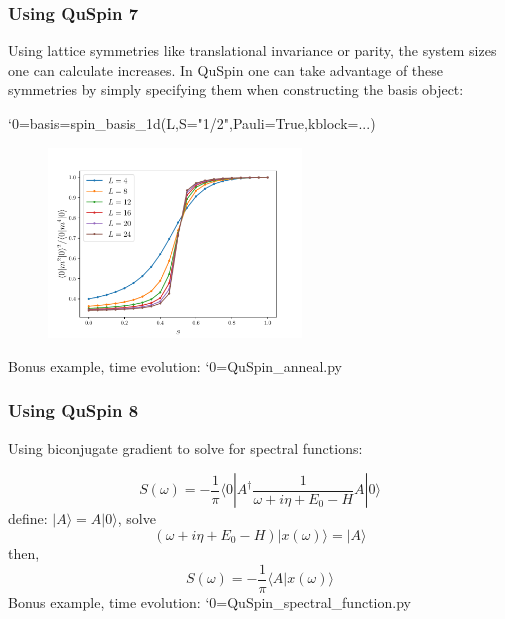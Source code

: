 \documentclass{beamer}
\newcommand\0{\scalebox{-1}[1]{0}}
\let\svttfamily\ttfamily
\renewcommand\ttfamily{\svttfamily\catcode`0=\active }
\renewcommand\texttt{\bgroup\ttfamily\texttthelp}
\def\texttthelp#1{#1\egroup}
\begin{document}
\begin{frame}
\frametitle{Using QuSpin 7}
Using lattice symmetries like translational invariance or parity, the system sizes one can calculate increases. In QuSpin one can take advantage of these symmetries by simply specifying them when constructing the basis object:

\texttt{basis=spin\_basis\_1d(L,S="1/2",Pauli=True,kblock=...)}
\begin{figure}
\includegraphics[width=0.6\textwidth]{anc/B.pdf}
\end{figure}
Bonus example, time evolution: \texttt{QuSpin\_anneal.py}
\end{frame}



\begin{frame}
	\frametitle{Using QuSpin 8}
	Using biconjugate gradient to solve for spectral functions:
	
	\begin{equation*}
		S(\omega) = -\frac{1}{\pi}\langle 0 |A^\dagger \frac{1}{\omega+i\eta+E_0-H} A|0\rangle
	\end{equation*}
	define: $|A\rangle = A|0\rangle$, solve
	\begin{equation}
		(\omega+i\eta+E_0-H)|x(\omega)\rangle = |A\rangle
	\end{equation}
	then,
	\begin{equation}
		S(\omega) = -\frac{1}{\pi}\langle A|x(\omega)\rangle
	\end{equation}
	Bonus example, time evolution: \texttt{QuSpin\_spectral\_function.py}
	
	
\end{frame}
\end{document}
